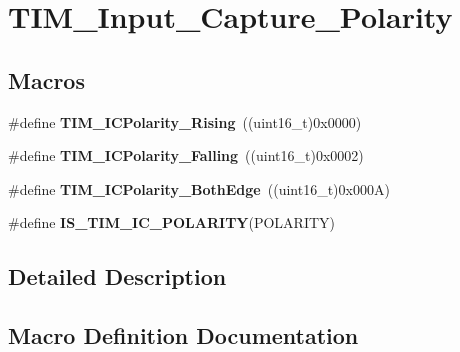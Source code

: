 \hypertarget{group___t_i_m___input___capture___polarity}{}\section{T\+I\+M\+\_\+\+Input\+\_\+\+Capture\+\_\+\+Polarity}
\label{group___t_i_m___input___capture___polarity}
\subsection*{Macros}
\begin{DoxyCompactItemize}
\item 
\#define {\bfseries T\+I\+M\+\_\+\+I\+C\+Polarity\+\_\+\+Rising}~((uint16\+\_\+t)0x0000)\hypertarget{group___t_i_m___input___capture___polarity_gabe598596b7dbcac446a4918105fa95a6}{}\label{group___t_i_m___input___capture___polarity_gabe598596b7dbcac446a4918105fa95a6}

\item 
\#define {\bfseries T\+I\+M\+\_\+\+I\+C\+Polarity\+\_\+\+Falling}~((uint16\+\_\+t)0x0002)\hypertarget{group___t_i_m___input___capture___polarity_ga70c6f5ed30a236bac4c690928e742243}{}\label{group___t_i_m___input___capture___polarity_ga70c6f5ed30a236bac4c690928e742243}

\item 
\#define {\bfseries T\+I\+M\+\_\+\+I\+C\+Polarity\+\_\+\+Both\+Edge}~((uint16\+\_\+t)0x000\+A)\hypertarget{group___t_i_m___input___capture___polarity_ga4632a6425d407c0d28b610b2d31cccc8}{}\label{group___t_i_m___input___capture___polarity_ga4632a6425d407c0d28b610b2d31cccc8}

\item 
\#define {\bfseries I\+S\+\_\+\+T\+I\+M\+\_\+\+I\+C\+\_\+\+P\+O\+L\+A\+R\+I\+TY}(P\+O\+L\+A\+R\+I\+TY)
\end{DoxyCompactItemize}


\subsection{Detailed Description}


\subsection{Macro Definition Documentation}
